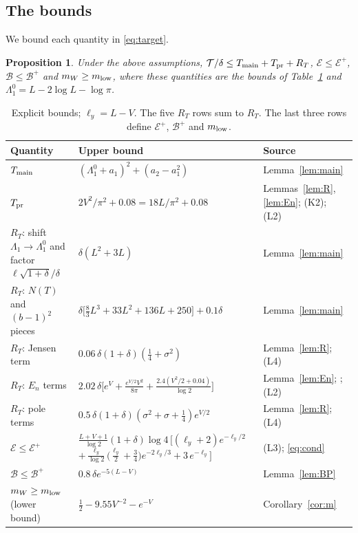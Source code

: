 \documentclass[11pt]{amsart}
\newtheorem{proposition}[theorem]{Proposition}
\theoremstyle{remark}
\begin{document}
\subsection{The bounds} We bound each quantity in \eqref{eq:target}.

\begin{proposition}\label{prop:table}
Under the above assumptions, $\mathcal T/\delta\le T_{\rm main}+T_{\rm pr}+R_T$, $\mathcal E\le\mathcal E^+$, $\mathcal B\le\mathcal B^+$ and $m_W\ge m_{\rm low}$, where these quantities are the bounds of Table~\ref{tab:rem} and $\Lambda_1^0=L-2\log L-\log\pi$.
\end{proposition}

\begin{table}[ht]
\centering\small
\renewcommand{\arraystretch}{1.35}
\begin{tabular}{@{}>{\raggedright}p{3.7cm}>{\raggedright}p{7.3cm}>{\raggedright\arraybackslash}p{2.6cm}@{}}
\toprule
Quantity & Upper bound & Source\\
\midrule
$T_{\rm main}$ & $(\Lambda_1^0+a_1)^2+(a_2-a_1^2)$ & Lemma~\ref{lem:main}\\
$T_{\rm pr}$ & $2V^2/\pi^2+0.08=18L/\pi^2+0.08$ & Lemmas~\ref{lem:R}, \ref{lem:En}; (K2); (L2)\\
\midrule
$R_T$: shift $\Lambda_1\to\Lambda_1^0$ and factor $\ell\sqrt{1+\delta}/\delta$ & $\delta(L^2+3L)$ & Lemma~\ref{lem:main}\\
$R_T$: $N(T)$ and $(b-1)^2$ pieces & $\delta\big[\frac83L^3+33L^2+136L+250\big]+0.1\delta$ & Lemma~\ref{lem:main}\\
$R_T$: Jensen term & $0.06\,\delta(1+\delta)(\frac14+\sigma^2)$ & Lemma~\ref{lem:R}; (L4)\\
$R_T$: $E_n$ terms & $2.02\,\delta\big[e^V+\frac{e^{V/2}V^2}{8\pi}+\frac{2.4(V^2/2+0.04)}{\log2}\big]$ & Lemma~\ref{lem:En}; \cite{Schoenfeld}; (L2)\\
$R_T$: pole terms & $0.5\,\delta(1+\delta)(\sigma^2+\sigma+\frac14)e^{V/2}$ & Lemma~\ref{lem:R}; (L4)\\
\midrule
$\mathcal E\le\mathcal E^+$ & $\frac{L+V+1}{\log2}(1+\delta)\log4\,\big[(\ell_y+2)e^{-\ell_y/2}$\newline
\hspace*{1.5em}$+\frac{\ell_y}{\log2}\big(\frac{\ell_y}2+\frac34\big)e^{-2\ell_y/3}+3\,e^{-\ell_y}\big]$ & (L3); \eqref{eq:cond}\\
$\mathcal B\le\mathcal B^+$ & $0.8\,\delta e^{-5(L-V)}$ & Lemma~\ref{lem:BP}\\
$m_W\ge m_{\rm low}$ (lower bound) & $\frac12-9.55V^{-2}-e^{-V}$ & Corollary~\ref{cor:m}\\
\bottomrule
\end{tabular}
\caption{Explicit bounds; $\ell_y=L-V$. The five $R_T$ rows sum to $R_T$. The last three rows define $\mathcal E^+$, $\mathcal B^+$ and $m_{\rm low}$.}\label{tab:rem}
\end{table}
\end{document}
